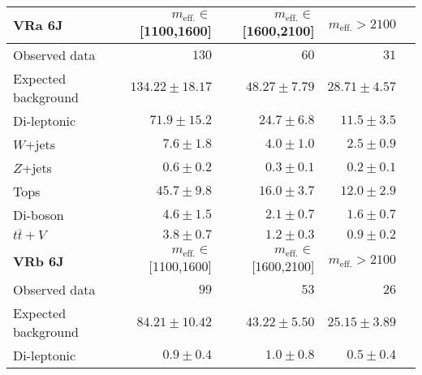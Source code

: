 \begin{table}
\begin{center}
  \end{center}
\end{table}




\begin{table}
  \begin{center}
    \caption{ \label{tab::BGestimation::VRyields_6J}   }

    \begin{tabular*}{\textwidth}{@{\extracolsep{\fill}}lrrrr}
      \toprule
      \textbf{VRa 6J} & $m_{\mathrm{eff.}}\in$[1100,1600] & $m_{\mathrm{eff.}}\in$[1600,2100] & $m_{\mathrm{eff.}}>2100$ \\
      \midrule
      
Observed data          & $130$              & $60$              & $31$                    \\
\midrule
Expected background         & $134.22 \pm 18.17$          & $48.27 \pm 7.79$          & $28.71 \pm 4.57$              \\
\midrule
        Di-leptonic         & $71.9 \pm 15.2$          & $24.7 \pm 6.8$          & $11.5 \pm 3.5$              \\
        $W$+jets         & $7.6 \pm 1.8$          & $4.0 \pm 1.0$          & $2.5 \pm 0.9$              \\
        $Z$+jets         & $0.6 \pm 0.2$          & $0.3 \pm 0.1$          & $0.2 \pm 0.1$              \\
        Tops         & $45.7 \pm 9.8$          & $16.0 \pm 3.7$          & $12.0 \pm 2.9$              \\
        Di-boson         & $4.6 \pm 1.5$          & $2.1 \pm 0.7$          & $1.6 \pm 0.7$              \\
        $t\bar{t}+V$         & $3.8 \pm 0.7$          & $1.2 \pm 0.3$          & $0.9 \pm 0.2$              \\
\toprule
\textbf{VRb 6J} &  $m_{\mathrm{eff.}}\in$[1100,1600] & $m_{\mathrm{eff.}}\in$[1600,2100] & $m_{\mathrm{eff.}}>2100$ \\
\midrule
Observed data          & $99$              & $53$              & $26$                    \\
\midrule
Expected background         & $84.21 \pm 10.42$          & $43.22 \pm 5.50$          & $25.15 \pm 3.89$              \\
\midrule
        Di-leptonic         & $0.9 \pm 0.4$          & $1.0 \pm 0.8$          & $0.5 \pm 0.4$              \\

\end{tabular*}
\end{center}
\end{table}
